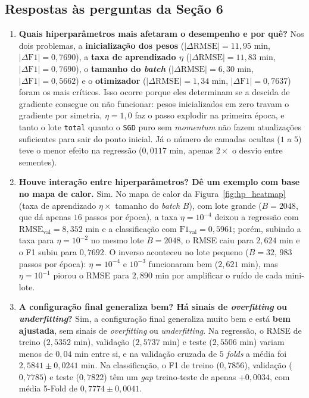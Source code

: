 \documentclass[12pt,a4paper]{article}
\begin{document}
\subsection{Respostas às perguntas da Seção 6}

\begin{enumerate}
    \item[(a)] \textbf{Quais hiperparâmetros mais afetaram o desempenho e por quê?}
    Nos dois problemas, a \textbf{inicialização dos pesos} ($|\Delta\text{RMSE}| = 11{,}95\text{ min}$, $|\Delta\text{F1}| = 0{,}7690$), a \textbf{taxa de aprendizado $\eta$} ($|\Delta\text{RMSE}| = 11{,}83\text{ min}$, $|\Delta\text{F1}| = 0{,}7690$), o \textbf{tamanho do \textit{batch}} ($|\Delta\text{RMSE}| = 6{,}30\text{ min}$, $|\Delta\text{F1}| = 0{,}5662$) e o \textbf{otimizador} ($|\Delta\text{RMSE}| = 1{,}34\text{ min}$, $|\Delta\text{F1}| = 0{,}7637$) foram os mais críticos. Isso ocorre porque eles determinam se a descida de gradiente consegue ou não funcionar: pesos inicializados em zero travam o gradiente por simetria, $\eta = 1{,}0$ faz o passo explodir na primeira época, e tanto o lote \texttt{total} quanto o \texttt{SGD} puro sem \textit{momentum} não fazem atualizações suficientes para sair do ponto inicial. Já o número de camadas ocultas ($1$ a $5$) teve o menor efeito na regressão ($0{,}0117\text{ min}$, apenas $2\times$ o desvio entre sementes).

    \item[(b)] \textbf{Houve interação entre hiperparâmetros? Dê um exemplo com base no mapa de calor.}
    Sim. No mapa de calor da Figura~\ref{fig:hp_heatmap} (taxa de aprendizado $\eta \times$ tamanho do \textit{batch} $B$), com lote grande ($B = 2048$, que dá apenas $16$ passos por época), a taxa $\eta = 10^{-4}$ deixou a regressão com $\text{RMSE}_{\text{val}} = 8{,}352\text{ min}$ e a classificação com $\text{F1}_{\text{val}} = 0{,}5961$; porém, subindo a taxa para $\eta = 10^{-2}$ no mesmo lote $B = 2048$, o RMSE caiu para $2{,}624\text{ min}$ e o F1 subiu para $0{,}7692$. O inverso aconteceu no lote pequeno ($B = 32$, $983$ passos por época): $\eta = 10^{-4}$ e $10^{-3}$ funcionaram bem ($2{,}621\text{ min}$), mas $\eta = 10^{-1}$ piorou o RMSE para $2{,}890\text{ min}$ por amplificar o ruído de cada mini-lote.

    \item[(c)] \textbf{A configuração final generaliza bem? Há sinais de \textit{overfitting} ou \textit{underfitting}?}
    Sim, a configuração final generaliza muito bem e está \textbf{bem ajustada}, sem sinais de \textit{overfitting} ou \textit{underfitting}. Na regressão, o RMSE de treino ($2{,}5352\text{ min}$), validação ($2{,}5737\text{ min}$) e teste ($2{,}5506\text{ min}$) variam menos de $0{,}04\text{ min}$ entre si, e na validação cruzada de $5$ \textit{folds} a média foi $2{,}5841 \pm 0{,}0241\text{ min}$. Na classificação, o F1 de treino ($0{,}7856$), validação ($0{,}7785$) e teste ($0{,}7822$) têm um \textit{gap} treino-teste de apenas $+0{,}0034$, com média 5-Fold de $0{,}7774 \pm 0{,}0041$.


\end{enumerate}
\end{document}
